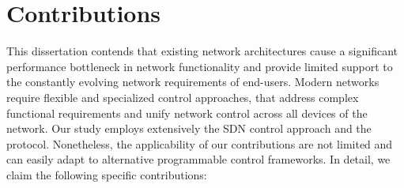 

\section{Contributions} \label{sec:intro:contributions}

This dissertation contends that existing network architectures cause a
significant performance bottleneck in network functionality and provide limited
support to the constantly evolving network requirements of end-users.  Modern
networks require flexible and specialized control approaches, that address
complex functional requirements and unify network control across all devices of
the network. Our study employs extensively the SDN control approach and the \of
protocol.  Nonetheless, the applicability of our contributions are not limited
and can easily adapt to alternative programmable control frameworks. In detail,
we claim the following specific contributions:

